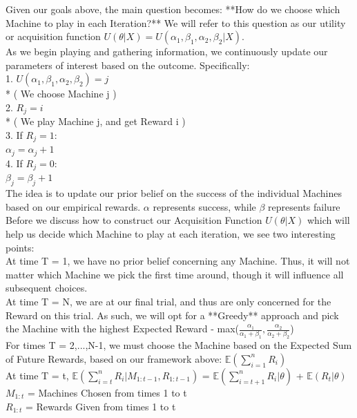\documentclass{article}
\begin{document}
Given our goals above, the main question becomes: **How do we choose which Machine to play in each Iteration?** We will refer to this question as our utility or acquisition function $U(\theta | X) = U(\alpha_1, \beta_1, \alpha_2, \beta_2 | X)$.\\

As we begin playing and gathering information, we continuously update our parameters of interest based on the outcome. Specifically:\\

1. $U(\alpha_1, \beta_1, \alpha_2, \beta_2) = j$ \\
    * ( We choose Machine j )\\
2. $R_j = i$  \\
    * ( We play Machine j, and get Reward i )\\
3. If $R_j = 1$:\\
    $\alpha_j = \alpha_j + 1$  \\
4. If $R_j = 0$:\\
    $\beta_j = \beta_j + 1$  \\

The idea is to update our prior belief on the success of the individual Machines based on our empirical rewards. $\alpha$ represents success, while $\beta$ represents failure\\

Before we discuss how to construct our Acquisition Function $U(\theta|X)$ which will help us decide which Machine to play at each iteration, we see two interesting points:\\

At time T = 1, we have no prior belief concerning any Machine. Thus, it will not matter which Machine we pick the first time around, though it will influence all subsequent choices.\\

At time T = N, we are at our final trial, and thus are only concerned for the Reward on this trial. As such, we will opt for a **Greedy** approach and pick the Machine with the highest Expected Reward - max($\frac{\alpha_1}{\alpha_1 + \beta_1}, \frac{\alpha_2}{\alpha_2 + \beta_2}$)\\

For times T = 2,...,N-1, we must choose the Machine based on the Expected Sum of Future Rewards, based on our framework above: $\mathbb{E}(\displaystyle\sum_{i=1}^{n} R_i)$\\

At time T = t, $\mathbb{E}(\displaystyle\sum_{i=t}^{n} R_i|M_{1:t-1}, R_{1:t-1})$ = $\mathbb{E}(\displaystyle\sum_{i=t+1}^{n} R_i|\theta)$ + $\mathbb{E}(R_t|\theta)$  \\
$M_{1:t}$ = Machines Chosen from times 1 to t  \\
$R_{1:t}$ = Rewards Given from times 1 to t\\
\end{document}
